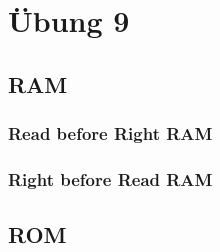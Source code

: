 \section{Übung 9}
\subsection{RAM}
\subsubsection{Read before Right RAM}
\subsubsection{Right before Read RAM}
%
\subsection{ROM}